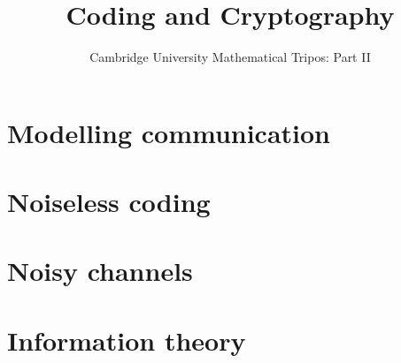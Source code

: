 \documentclass{article}
\title{Coding and Cryptography}
\author{Cambridge University Mathematical Tripos: Part II}
\begin{document}
\maketitle

\tableofcontentsnewpage{}

\section{Modelling communication}

\section{Noiseless coding}

\section{Noisy channels}

\section{Information theory}

\end{document}
